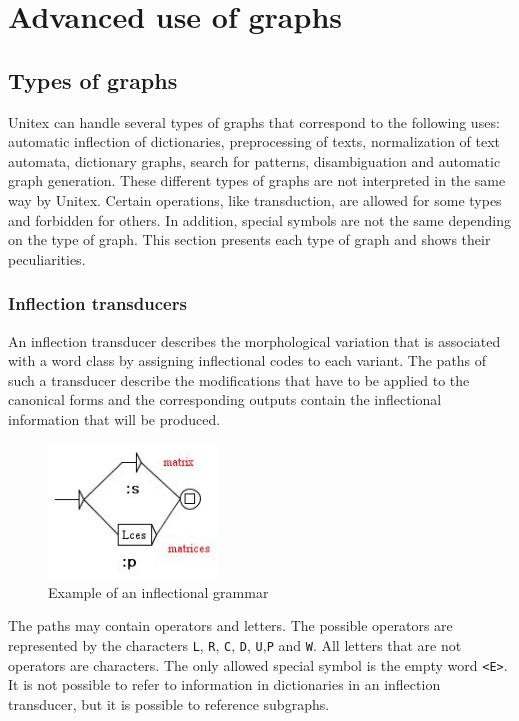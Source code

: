 \chapter{Advanced use of graphs}
\label{chap-advanced-grammars}
\section{Types of graphs}
Unitex can handle several types of graphs that correspond to the following
uses: automatic inflection of dictionaries, preprocessing of texts, normalization
of text automata, dictionary graphs, search for patterns, disambiguation and
automatic graph generation. These different types of graphs are not interpreted
in the same way by Unitex. Certain operations, like transduction, are allowed for
some types and forbidden for others. In addition, special symbols are not the
same depending on the type of graph. This section presents each type of graph
and shows their peculiarities.

\subsection{Inflection transducers}
An inflection transducer describes the morphological variation that is associated
with a word class by assigning inflectional codes to each variant. The paths of
such a transducer describe the modifications that have to be applied to the canonical
forms and the corresponding outputs contain the inflectional information that will be
produced.

\bigskip
\begin{figure}[!h]
\begin{center}
\includegraphics[width=4.5cm]{resources/img/fig6-1.png}
\caption{Example of an inflectional grammar}
\end{center}
\end{figure}

\noindent The paths may contain operators and letters. The possible operators
are represented by the characters \verb+L+, \verb+R+, \verb+C+, \verb+D+, 
\verb+U+,\verb+P+ and \verb+W+.
All letters that are not operators are characters. The only
allowed special symbol is the empty word \verb+<E>+. It is not
possible to refer to information in dictionaries in an inflection transducer,
but it is possible to reference subgraphs.

